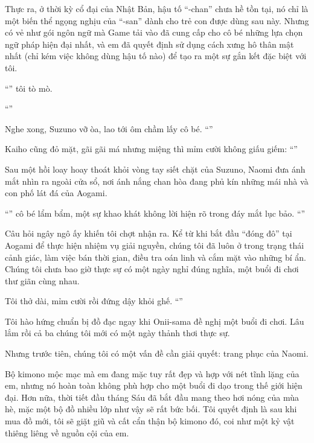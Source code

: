 \documentclass[../main.tex]{subfiles}
\begin{document}
Thực ra, ở thời kỳ cổ đại của Nhật Bản, hậu tố ``-chan'' chưa hề tồn tại, nó chỉ là một biến thể ngọng nghịu của ``-san'' dành cho trẻ con được dùng sau này. Nhưng có vẻ như gói ngôn ngữ mà Game tải vào đã cung cấp cho cô bé những lựa chọn ngữ pháp hiện đại nhất, và em đã quyết định sử dụng cách xưng hô thân mật nhất (chỉ kém việc không dùng hậu tố nào) để tạo ra một sự gắn kết đặc biệt với tôi.

``'' tôi tò mò.

``''

Nghe xong, Suzuno vỡ òa, lao tới ôm chầm lấy cô bé. ``''

Kaiho cũng đỏ mặt, gãi gãi má nhưng miệng thì mỉm cười không giấu giếm: ``''

Sau một hồi loay hoay thoát khỏi vòng tay siết chặt của Suzuno, Naomi đưa ánh mắt nhìn ra ngoài cửa sổ, nơi ánh nắng chan hòa đang phủ kín những mái nhà và con phố lát đá của Aogami.

``'' cô bé lẩm bẩm, một sự khao khát không lời hiện rõ trong đáy mắt lục bảo. ``''

Câu hỏi ngây ngô ấy khiến tôi chợt nhận ra. Kể từ khi bắt đầu ``đóng đô'' tại Aogami để thực hiện nhiệm vụ giải nguyền, chúng tôi đã luôn ở trong trạng thái cảnh giác, làm việc bán thời gian, điều tra oán linh và cắm mặt vào những bí ẩn. Chúng tôi chưa bao giờ thực sự có một ngày nghỉ đúng nghĩa, một buổi đi chơi thư giãn cùng nhau.

Tôi thở dài, mỉm cười rồi đứng dậy khỏi ghế. ``''


Tôi hào hứng chuẩn bị đồ đạc ngay khi Onii-sama đề nghị một buổi đi chơi. Lâu lắm rồi cả ba chúng tôi mới có một ngày thảnh thơi thực sự.

Nhưng trước tiên, chúng tôi có một vấn đề cần giải quyết: trang phục của Naomi.

Bộ kimono mộc mạc mà em đang mặc tuy rất đẹp và hợp với nét tĩnh lặng của em, nhưng nó hoàn toàn không phù hợp cho một buổi đi dạo trong thế giới hiện đại. Hơn nữa, thời tiết đầu tháng Sáu đã bắt đầu mang theo hơi nóng của mùa hè, mặc một bộ đồ nhiều lớp như vậy sẽ rất bức bối. Tôi quyết định là sau khi mua đồ mới, tôi sẽ giặt giũ và cất cẩn thận bộ kimono đó, coi như một kỷ vật thiêng liêng về nguồn cội của em.
\end{document}
